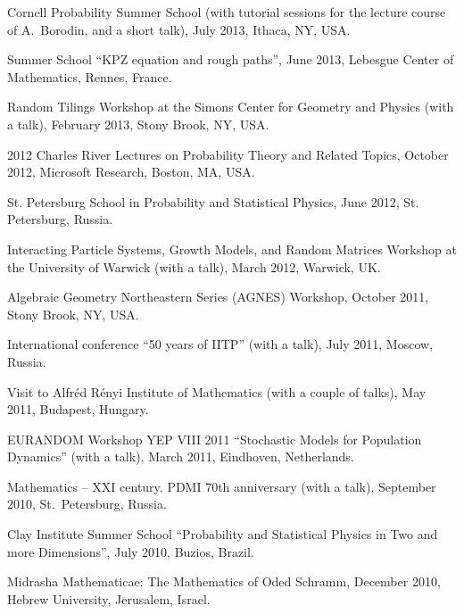 \documentclass[letterpaper,11pt]{article}
\begin{document}
\begin{etaremune}
\item
Cornell Probability Summer School (with tutorial sessions for the lecture course of 
A.~Borodin, and a short talk), July 2013, Ithaca, NY, USA.

\item Summer School ``KPZ equation and rough paths'', 
June 2013, 
Lebesgue Center of Mathematics, Rennes, France.

\item 
Random Tilings Workshop at the 
Simons Center for Geometry and Physics (with a talk),
February 2013, Stony Brook, NY, USA.

\item 2012 Charles River Lectures on Probability Theory and Related Topics, 
October 2012, Microsoft Research, Boston, MA, USA.

\item St. Petersburg School in Probability and Statistical Physics, June 2012, St. Petersburg, Russia.

\item 
Interacting Particle Systems, Growth Models, and Random Matrices Workshop at the University of Warwick (with a talk), March 2012, Warwick, UK.

\item Algebraic Geometry Northeastern Series (AGNES) Workshop, 
October 2011,
Stony Brook, NY, USA.

\item International conference ``50 years of IITP'' (with a talk), July 2011, Moscow, Russia.
  
\item Visit to Alfr\'ed R\'enyi Institute of Mathematics (with a couple of talks), May 2011, Budapest, Hungary.

\item EURANDOM Workshop YEP VIII 2011 ``Stochastic Models for Population Dynamics'' (with a talk), March 2011, Eindhoven, Netherlands.

\item Mathematics -- XXI century. PDMI 70th anniversary (with a talk), September 2010, St.~Petersburg, Russia.

\item Clay Institute Summer School ``Probability and Statistical Physics in Two and more Dimensions'', July 2010, Buzios, Brazil. 

\item Midrasha Mathematicae: The Mathematics of Oded Schramm, December 2010, Hebrew University, Jerusalem, Israel. 


\end{etaremune}
\end{document}
